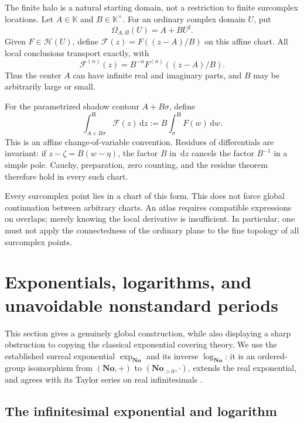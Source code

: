 \documentclass[11pt,letterpaper]{article}
\numberwithin{equation}{section}
\theoremstyle{definition}
\theoremstyle{remark}
\newcommand{\No}{\mathbf{No}}
\newcommand{\K}{\mathbb{K}}
\newcommand{\HH}{\mathcal{H}}
\newcommand{\dd}{\,\mathrm{d}}
\newcommand{\cint}{\mathop{\int}\nolimits^{\mathrm H}}
\begin{document}
The finite halo is a natural starting domain, not a restriction to finite
surcomplex locations. Let $A\in\K$ and $B\in\K^\times$. For an ordinary
complex domain $U$, put
\[
 \Omega_{A,B}(U)=A+B U^\sharp.
\]
Given $F\in\HH(U)$, define
$\mathcal F(z)=F((z-A)/B)$ on this affine chart. All local conclusions
transport exactly, with
\begin{equation}\label{eq:affinederivative}
 \mathcal F^{(n)}(z)=B^{-n}F^{(n)}((z-A)/B).
\end{equation}
Thus the center $A$ can have infinite real and imaginary parts, and $B$ may
be arbitrarily large or small.

For the parametrized shadow contour $A+B\sigma$, define
\begin{equation}\label{eq:affineintegral}
 \cint_{A+B\sigma}\mathcal F(z)\dd z
 :=B\cint_\sigma F(w)\dd w.
\end{equation}
This is an affine change-of-variable convention. Residues of differentials
are invariant: if $z-\zeta=B(w-\eta)$, the factor $B$ in $\dd z$ cancels
the factor $B^{-1}$ in a simple pole. Cauchy, preparation, zero counting, and
the residue theorem therefore hold in every such chart.

Every surcomplex point lies in a chart of this form. This does not force
global continuation between arbitrary charts. An atlas requires compatible
expressions on overlaps; merely knowing the local derivative is insufficient.
In particular, one must not apply the connectedness of the ordinary plane to
the fine topology of all surcomplex points.

\section{Exponentials, logarithms, and unavoidable nonstandard periods}\label{sec:globalexp}

This section gives a genuinely global construction, while also displaying a
sharp obstruction to copying the classical exponential covering theory.
We use the established surreal exponential $\exp_{\No}$ and its inverse
$\log_{\No}$: it is an ordered-group isomorphism from $(\No,+)$ to
$(\No_{>0},\cdot)$, extends the real exponential, and agrees with its Taylor
series on real infinitesimals \cite{Gonshor,BMderivations}.

\subsection{The infinitesimal exponential and logarithm}
\end{document}
